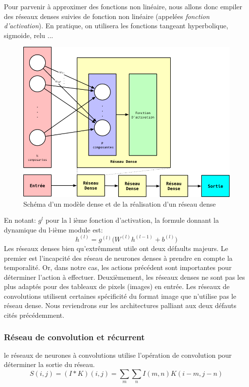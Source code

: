 Pour parvenir à approximer des fonctions non linéaire, nous allons donc empiler des réseaux denses suivies de fonction non linéaire (appelées \emph{fonction d'activation}). En pratique, on utilisera les fonctions tangeant hyperbolique, sigmoide, relu ...

\begin{figure}[ht]
\begin{center}
    \includegraphics[scale=.3]{./assets/DeepLearning/Dense}
    \caption{Schéma d'un modèle dense et de la réalisation d'un réseau dense}
\end{center}
\end{figure}
En notant: $g^l$ pour la l ième fonction d'activation, la formule donnant la dynamique du l-ième module est: $$h^{(l)} = g^{(l)}\big(W^{(l)}h^{(l-1)} + b^{(l)} \big)$$
Les réseaux denses bien qu'extrêmment utile ont deux défaults majeurs. Le premier est l'incapcité des réseau de neurones denses à prendre en compte la temporalité. Or, dans notre cas, les actions précédent sont importantes pour déterminer l'action à effectuer. Deuxièmement, les réseaux denses ne sont pas les plus adaptés pour des tableaux de pixels (images) en entrée. Les réseaux de convolutions utilisent certaines spécificité du format image que n'utilise pas le réseau dense. Nous reviendrons sur les architectures palliant aux deux défauts cités précédemment. 

\subsubsection{Réseau de convolution et récurrent}
le réseaux de neurones à convolutions utilise l'opération de convolution pour déterminer la sortie du réseau. 
$$S(i,j) = (I * K) (i, j) = \underset{m}{\sum} \underset{n}{\sum} I(m,n) K(i-m, j-n)$$

